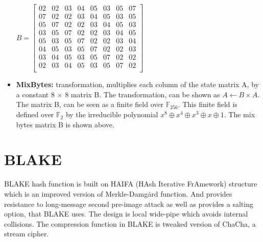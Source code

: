 \begin{itemize}
  $B = \begin{bmatrix}
  02 & 02 & 03 & 04 & 05 & 03 & 05 & 07 \\
  07 & 02 & 02 & 03 & 04 & 05 & 03 & 05 \\
  05 & 07 & 02 & 02 & 03 & 04 & 05 & 03 \\
  03 & 05 & 07 & 02 & 02 & 03 & 04 & 05 \\
  05 & 03 & 05 & 07 & 02 & 02 & 03 & 04 \\
  04 & 05 & 03 & 05 & 07 & 02 & 02 & 03 \\
  03 & 04 & 05 & 03 & 05 & 07 & 02 & 02 \\
  02 & 03 & 04 & 05 & 03 & 05 & 07 & 02 \\
  \end{bmatrix}$
  
  \item {\bf MixBytes:} transformation, multiplies each column of the state matrix A, by a constant 8 $\times$ 8 matrix B.
  The transformation, can be shown as $ A \gets B \times A$. The matrix B, can be seen as a finite field over $\mathbb{F}_{256}$.
  This finite field is defined over $\mathbb{F}_{2}$ by the irreducible polynomial $x^{8} \oplus x^{4} \oplus x^{3} \oplus x \oplus 1$.
  The mix bytes matrix B is shown above.

  \end{itemize}

\section{BLAKE} 

BLAKE\cite{00002} hash function is built on HAIFA (HAsh Iterative FrAmework) structure \cite{00020} which is an improved
version of Merkle-Damg\.{a}rd function. And provides resistance to long-message second pre-image attack as well as
provides a salting option, that BLAKE uses\cite{00021}.
The design is local wide-pipe which avoids internal collisions. The compression function in BLAKE is tweaked version of 
ChaCha, a stream cipher. 

